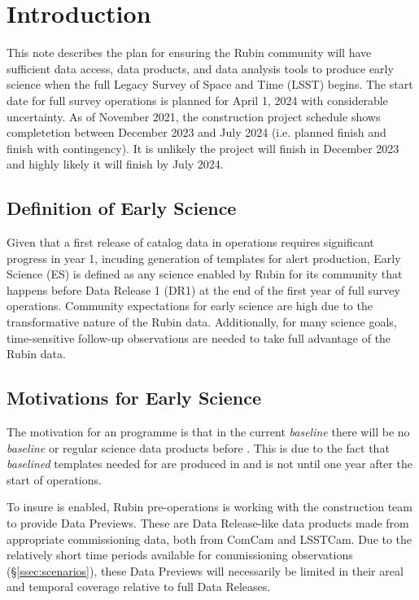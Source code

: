 \section{Introduction}

This  note describes the plan for ensuring the Rubin community will have sufficient data access, data products, and data analysis tools to produce early science when the full Legacy Survey of Space and Time (LSST)  begins. The start date for full survey operations is planned for April 1, 2024 with considerable uncertainty. As of November 2021, the construction project schedule shows completetion between December 2023 and July 2024 (i.e. planned finish and finish with contingency). It is unlikely the project will finish in December 2023 and highly likely it will finish by July 2024. 

\subsection{Definition of Early Science}  \label{ssec:defn}

Given that a first release of catalog data in operations requires significant progress in year 1, incuding generation of templates for alert production, Early Science (ES) is defined as any science enabled by Rubin for its community that happens before Data Release 1 (DR1) at the end of the first year of full survey operations. 
Community expectations for early science are high due to the transformative nature of the Rubin data.  
Additionally, for many science goals, time-sensitive follow-up observations are needed to take full advantage of the Rubin data.

\subsection{Motivations for Early Science}
The motivation for an \es programme is that in the current {\it baseline} there will be no {\it baseline} or regular science data products before \drone. 
This is due to the fact that {\it baselined} templates needed for \diffim are produced in \drp and \drone is not until one year after the start of operations.

To insure \es is enabled, Rubin pre-operations is working with the construction team to provide Data Previews. These are Data Release-like data products made from appropriate commissioning data, both from ComCam and LSSTCam. 
Due to the relatively short time periods available for commissioning observations (\S \ref{ssec:scenarios}), these Data Previews will necessarily be limited in their areal and temporal coverage relative to full Data Releases.

